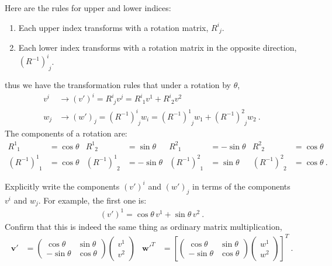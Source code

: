 \documentclass[12pt]{article}
\renewcommand{\vec}[1]{\mathbf{#1}} %
\begin{document}
Here are the rules for upper and lower indices:
\begin{enumerate}
	\item Each upper index transforms with a rotation matrix, $R^i_{\phantom i j}$. 
	\item Each lower index transforms with a rotation matrix in the opposite direction, $(R^{-1})^i_{\phantom i j}$. 
\end{enumerate}
thus we have the transformation rules that under a rotation by $\theta$,
\begin{align}
	v^i &\to (v')^i = R^i_{\phantom i j} v^j = R^i_{\phantom i 1}v^1 + R^i_{\phantom i 2}v^2
	\label{eq:v}
	\\
	w_j &\to (w')_j = (R^{-1})^i_{\phantom i j} w_i = (R^{-1})^1_{\phantom 1 j}w_1 + (R^{-1})^2_{\phantom 2 j}w_2 \ .
	\label{eq:w}
\end{align}
The components of a rotation are:
\begin{align}
	R^1_{\phantom 1 1} &= \cos \theta
	&
	R^1_{\phantom 1 2} &= \sin\theta
	&
	R^2_{\phantom 2 1} &= -\sin\theta
	&
	R^2_{\phantom 2 2} &= \cos \theta 
	\label{eq:rot}
	\\
	(R^{-1})^1_{\phantom 1 1} &= \cos \theta
	&
	(R^{-1})^1_{\phantom 1 2} &= -\sin\theta
	&
	(R^{-1})^2_{\phantom 2 1} &= \sin\theta
	&
	(R^{-1})^2_{\phantom 2 2} &= \cos \theta \ .
\end{align}

Explicitly write the components $(v')^i$ and $(w')_j$ in terms of the components $v^i$ and $w_j$. For example, the first one is:
\begin{align}
	(v')^1 = \cos \theta \, v^1 + \sin\theta  \, v^2 \ .
\end{align}
Confirm that this is indeed the same thing as ordinary matrix multiplication,
\begin{align}
\vec{v}' &=
 \begin{pmatrix}
		\cos \theta & \sin \theta \\
		-\sin \theta & \cos \theta
	\end{pmatrix}
	\begin{pmatrix}
		v^1 \\
		v^2
	\end{pmatrix} 
	&
\vec{w'}^T &=
\left[
 \begin{pmatrix}
		\cos \theta & \sin \theta \\
		-\sin \theta & \cos \theta
	\end{pmatrix}
	\begin{pmatrix}
		w^1 \\
		w^2
	\end{pmatrix} \right]^T
	\ .
\end{align}
\end{document}
